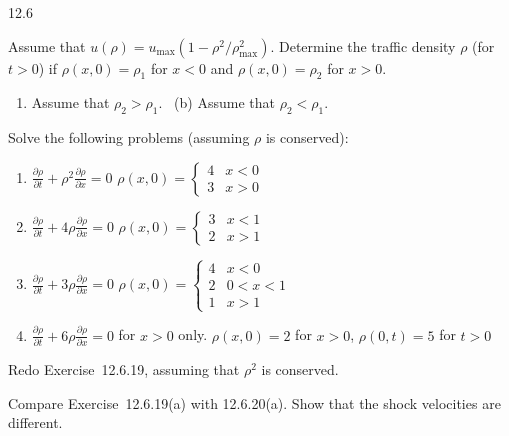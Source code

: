 \begin{exercises}{12.6}
\item \label{ex:12.6.18}
Assume that $u(\rho) = u_{\max}(1 - \rho^2/\rho_{\max}^2)$.  Determine the traffic density $\rho$ (for $t > 0$) if $\rho(x,0) = \rho_1$ for $x < 0$ and $\rho(x,0) = \rho_2$ for $x > 0$.
\begin{enumerate}
\item[(a)] Assume that $\rho_2 > \rho_1$. \hfill \starred\ (b) Assume that $\rho_2 < \rho_1$.
\end{enumerate}

\item \label{ex:12.6.19}
Solve the following problems (assuming $\rho$ is conserved):
\begin{enumerate}
\item[(a)] $\frac{\partial\rho}{\partial t} + \rho^2\frac{\partial\rho}{\partial x} = 0$ \quad $\rho(x,0) = \begin{cases} 4 & x < 0 \\ 3 & x > 0 \end{cases}$

\item[(b)] $\frac{\partial\rho}{\partial t} + 4\rho\frac{\partial\rho}{\partial x} = 0$ \quad $\rho(x,0) = \begin{cases} 3 & x < 1 \\ 2 & x > 1 \end{cases}$

\item[(c)] $\frac{\partial\rho}{\partial t} + 3\rho\frac{\partial\rho}{\partial x} = 0$ \quad $\rho(x,0) = \begin{cases} 4 & x < 0 \\ 2 & 0 < x < 1 \\ 1 & x > 1 \end{cases}$

\item[(d)] $\frac{\partial\rho}{\partial t} + 6\rho\frac{\partial\rho}{\partial x} = 0$ for $x > 0$ only. \quad $\rho(x,0) = 2$ for $x > 0$, $\rho(0,t) = 5$ for $t > 0$
\end{enumerate}

\item \label{ex:12.6.20}
Redo Exercise~12.6.19, assuming that $\rho^2$ is conserved.

\item \label{ex:12.6.21}
Compare Exercise~12.6.19(a) with 12.6.20(a).  Show that the shock velocities are different.


\end{exercises}
